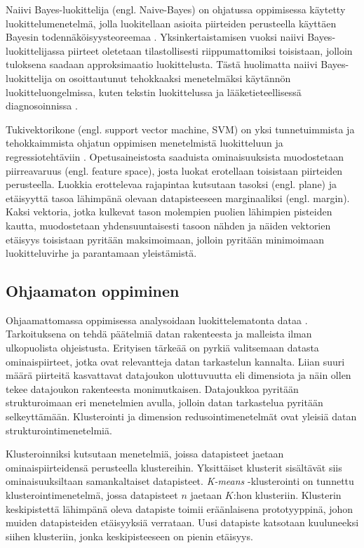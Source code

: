 \documentclass[utf8]{gradu3}
\begin{document}
Naiivi Bayes-luokittelija (engl. Naive-Bayes) on ohjatussa oppimisessa käytetty luokittelumenetelmä, jolla luokitellaan asioita piirteiden perusteella käyttäen Bayesin todennäköisyysteoreemaa \parencite{nasteski2017overview,rish2001empirical}. Yksinkertaistamisen vuoksi naiivi Bayes-luokittelijassa piirteet oletetaan tilastollisesti riippumattomiksi toisistaan, jolloin tuloksena saadaan approksimaatio luokittelusta. Tästä huolimatta naiivi Bayes-luokittelija on osoittautunut tehokkaaksi menetelmäksi käytännön luokitteluongelmissa, kuten tekstin luokittelussa ja lääketieteellisessä diagnosoinnissa \parencite{rish2001empirical}.

Tukivektorikone (engl. support vector machine, SVM) on yksi tunnetuimmista ja tehokkaimmista ohjatun oppimisen menetelmistä luokitteluun ja regressiotehtäviin \parencite{cervantes2020comprehensive,osisanwo2017supervised}. Opetusaineistosta saaduista ominaisuuksista muodostetaan piirreavaruus (engl. feature space), josta luokat erotellaan toisistaan piirteiden perusteella. Luokkia erottelevaa rajapintaa kutsutaan tasoksi (engl. plane) ja etäisyyttä tasoa lähimpänä olevaan datapisteeseen marginaaliksi (engl. margin). Kaksi vektoria, jotka kulkevat tason molempien puolien lähimpien pisteiden kautta, muodostetaan yhdensuuntaisesti tasoon nähden ja näiden vektorien etäisyys toisistaan pyritään maksimoimaan, jolloin pyritään minimoimaan luokitteluvirhe ja parantamaan yleistämistä.

\subsection{Ohjaamaton oppiminen}

Ohjaamattomassa oppimisessa analysoidaan luokittelematonta dataa \parencite{das2017survey,jordan2015machine}. Tarkoituksena on tehdä päätelmiä datan rakenteesta ja malleista ilman ulkopuolista ohjeistusta. Erityisen tärkeää on pyrkiä valitsemaan datasta ominaispiirteet, jotka ovat relevantteja datan tarkastelun kannalta. Liian suuri määrä piirteitä kasvattavat datajoukon ulottuvuutta eli dimensiota ja näin ollen tekee datajoukon rakenteesta monimutkaisen. Datajoukkoa pyritään strukturoimaan eri menetelmien avulla, jolloin datan tarkastelua pyritään selkeyttämään. Klusterointi ja dimension redusointimenetelmät ovat yleisiä datan strukturointimenetelmiä.

Klusteroinniksi kutsutaan menetelmiä, joissa datapisteet jaetaan ominaispiirteidensä perusteella klustereihin. Yksittäiset klusterit sisältävät siis ominaisuuksiltaan samankaltaiset datapisteet. \textit{K-means} -klusterointi on tunnettu klusterointimenetelmä, jossa datapisteet \(n\) jaetaan \(K\):hon klusteriin. Klusterin keskipistettä lähimpänä oleva datapiste toimii eräänlaisena prototyyppinä, johon muiden datapisteiden etäisyyksiä verrataan. Uusi datapiste katsotaan kuuluneeksi siihen klusteriin, jonka keskipisteeseen on pienin etäisyys.
\end{document}
